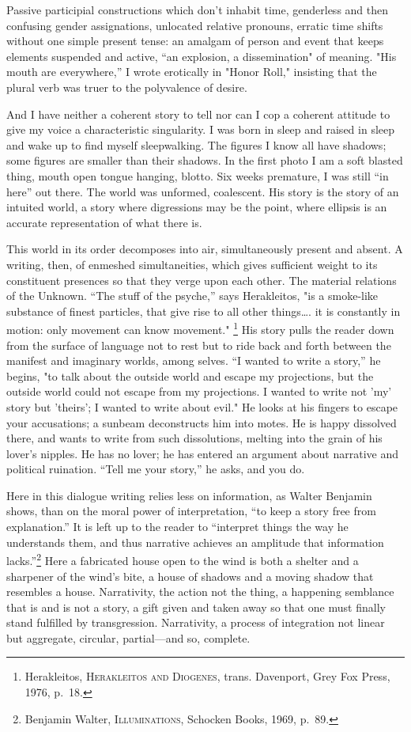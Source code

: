 \documentclass[
]{memoir}
\begin{document}
Passive participial constructions which don't inhabit time, genderless
and then confusing gender assignations, unlocated relative pronouns,
erratic time shifts without one simple present tense: an amalgam of
person and event that keeps elements suspended and active, ``an
explosion, a dissemination" of meaning. "His mouth are everywhere,'' I
wrote erotically in "Honor Roll," insisting that the plural verb was
truer to the polyvalence of desire.

And I have neither a coherent story to tell nor can I cop a coherent
attitude to give my voice a characteristic singularity. I was born in
sleep and raised in sleep and wake up to find myself sleepwalking. The
figures I know all have shadows; some figures are smaller than their
shadows. In the first photo I am a soft blasted thing, mouth open tongue
hanging, blotto. Six weeks premature, I was still ``in here'' out there.
The world was unformed, coalescent. His story is the story of an
intuited world, a story where digressions may be the point, where
ellipsis is an accurate representation of what there is.

This world in its order decomposes into air, simultaneously present and
absent. A writing, then, of enmeshed simultaneities, which gives
sufficient weight to its constituent presences so that they verge upon
each other. The material relations of the Unknown. ``The stuff of the
psyche,'' says Herakleitos, "is a smoke-like substance of finest
particles, that give rise to all other things\ldots{}. it is constantly
in motion: only movement can know movement." \footnote{Herakleitos,
  \textsc{Herakleitos and Diogenes}, trans. Davenport, Grey Fox Press,
  1976, p.~18.} His story pulls the reader down from the surface of
language not to rest but to ride back and forth between the manifest and
imaginary worlds, among selves. ``I wanted to write a story,'' he
begins, "to talk about the outside world and escape my projections, but
the outside world could not escape from my projections. I wanted to
write not 'my' story but 'theirs'; I wanted to write about evil." He
looks at his fingers to escape your accusations; a sunbeam deconstructs
him into motes. He is happy dissolved there, and wants to write from
such dissolutions, melting into the grain of his lover's nipples. He has
no lover; he has entered an argument about narrative and political
ruination. ``Tell me your story,'' he asks, and you do.

Here in this dialogue writing relies less on information, as Walter
Benjamin shows, than on the moral power of interpretation, ``to keep a
story free from explanation.'' It is left up to the reader to
``interpret things the way he understands them, and thus narrative
achieves an amplitude that information lacks.''\footnote{Benjamin
  Walter, \textsc{Illuminations}, Schocken Books, 1969, p.~89.} Here a
fabricated house open to the wind is both a shelter and a sharpener of
the wind's bite, a house of shadows and a moving shadow that resembles a
house. Narrativity, the action not the thing, a happening semblance that
is and is not a story, a gift given and taken away so that one must
finally stand fulfilled by transgression. Narrativity, a process of
integration not linear but aggregate, circular, partial---and so,
complete.
\end{document}
